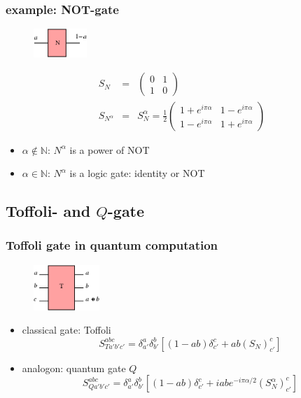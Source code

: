 \documentclass{beamer}
\begin{document}
\begin{frame}
	\frametitle{example: NOT-gate}
	\begin{figure}
		\centering
		\includegraphics[width=2cm]{not.png}
	\end{figure}
	\begin{eqnarray}
		S_N&=&\begin{pmatrix}0&1\\1&0\end{pmatrix}\\
		S_{N^\alpha}&=&S_N^\alpha=\frac{1}{2}\begin{pmatrix}1+e^{i\pi\alpha}&1-e^{i\pi\alpha}\\1-e^{i\pi\alpha}&1+e^{i\pi\alpha}\end{pmatrix}
	\end{eqnarray}
	\begin{itemize}
		\item $\alpha\notin\mathbb{N}$: $N^\alpha$ is a power of NOT
		\item $\alpha\in\mathbb{N}$: $N^\alpha$ is a logic gate: identity or NOT
	\end{itemize}
\end{frame}
%
\subsection{Toffoli- and $Q$-gate}
\begin{frame}
	\frametitle{Toffoli gate in quantum computation}
	\begin{figure}
		\centering
		\includegraphics[width=2.5cm]{toffoli.png}
	\end{figure}
	\begin{itemize}
		\item<1-> classical gate: Toffoli
		\begin{equation}
			S_{Ta'b'c'}^{abc}=\delta_{a'}^a\delta_{b'}^b[(1-ab)\delta_{c'}^c+ab(S_N)_{c'}^c]
		\end{equation}
		\item<2-> analogon: quantum gate $Q$
		\begin{equation}
			S_{Qa'b'c'}^{abc}=\delta_{a'}^a\delta_{b'}^b\left[(1-ab)\delta_{c'}^c+iab e^{-i\pi\alpha/2}(S_N^\alpha)_{c'}^c\right]
		\end{equation}
	\end{itemize}
\end{frame}
%
\end{document}
